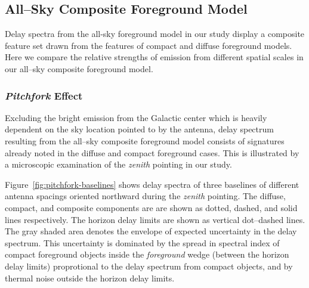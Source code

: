 \documentclass[preprint2,iop,numberedappendix]{emulateapj}
\begin{document}
\subsection{All--Sky Composite Foreground Model}\label{sec:composite}

Delay spectra from the all-sky foreground model in our study display a composite feature set drawn from the features of compact and diffuse foreground models. Here we compare the relative strengths of emission from different spatial scales in our all--sky composite foreground model. 

\subsubsection{{\it Pitchfork} Effect}\label{sec:pitchfork}

Excluding the bright emission from the Galactic center which is heavily dependent on the sky location pointed to by the antenna, delay spectrum resulting from the all--sky composite foreground model consists of signatures already noted in the diffuse and compact foreground cases. This is illustrated by a microscopic examination of the {\it zenith} pointing in our study. 

Figure~\ref{fig:pitchfork-baselines} shows delay spectra of three baselines of different antenna spacings oriented northward during the {\it zenith} pointing. The diffuse, compact, and composite components are are shown as dotted, dashed, and solid lines respectively. The horizon delay limits are shown as vertical dot--dashed lines. The gray shaded area denotes the envelope of expected uncertainty in the delay spectrum. This uncertainty is dominated by the spread in spectral index of compact foreground objects inside the {\it foreground} wedge (between the horizon delay limits) proprotional to the delay spectrum from compact objects, and by thermal noise outside the horizon delay limits.
\end{document}

